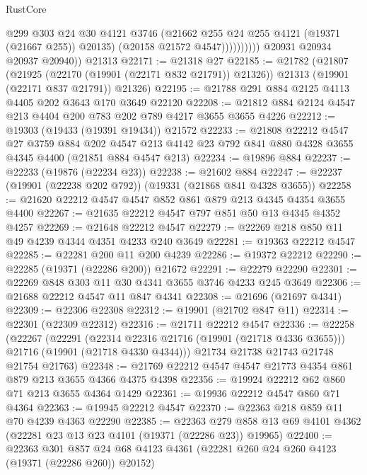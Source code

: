 \begin{lexlean}{RustCore}
\begin{coremodule}
                          @299
                          @303
                          @24
                          @30
                          @4121
                          @3746
                          (@21662 @255 @24 @255 @4121 (@19371 (@21667 @255)) @20135)
                          (@20158 @21572 @4547))))))))))
        @20931
        @20934
        @20937
        @20940))
    @21313
@22171 := @21318 @27
@22185 := @21782
    (@21807
      (@21925 (@22170 (@19901 (@22171 @832 @21791)) @21326))
      @21313
      (@19901 (@22171 @837 @21791))
      @21326)
@22195 := @21788 @291 @884 @2125 @4113 @4405 @202 @3643 @170 @3649 @22120
@22208 := @21812 @884 @2124 @4547 @213 @4404 @200 @783 @202 @789 @4217 @3655 @3655 @4226
@22212 := @19303 (@19433 (@19391 @19434)) @21572
@22233 := @21808
    @22212
    @4547
    @27
    @3759
    @884
    @202
    @4547
    @213
    @4142
    @23
    @792
    @841
    @880
    @4328
    @3655
    @4345
    @4400
    (@21851 @884 @4547 @213)
@22234 := @19896 @884
@22237 := @22233 (@19876 (@22234 @23))
@22238 := @21602 @884
@22247 := @22237 (@19901 (@22238 @202 @792)) (@19331 (@21868 @841 @4328 @3655))
@22258 := @21620 @22212 @4547 @4547 @852 @861 @879 @213 @4345 @4354 @3655 @4400
@22267 := @21635 @22212 @4547 @797 @851 @50 @13 @4345 @4352 @4257
@22269 := @21648 @22212 @4547
@22279 := @22269 @218 @850 @11 @49 @4239 @4344 @4351 @4233 @240 @3649
@22281 := @19363 @22212 @4547
@22285 := @22281 @200 @11 @200 @4239
@22286 := @19372 @22212
@22290 := @22285 (@19371 (@22286 @200)) @21672
@22291 := @22279 @22290
@22301 := @22269 @848 @303 @11 @30 @4341 @3655 @3746 @4233 @245 @3649
@22306 := @21688 @22212 @4547 @11 @847 @4341
@22308 := @21696 (@21697 @4341)
@22309 := @22306 @22308
@22312 := @19901 (@21702 @847 @11)
@22314 := @22301 (@22309 @22312)
@22316 := @21711 @22212 @4547
@22336 := @22258
    (@22267
      (@22291
        (@22314 @22316 @21716 (@19901 (@21718 @4336 @3655)))
        @21716
        (@19901 (@21718 @4330 @4344)))
      @21734
      @21738
      @21743
      @21748
      @21754
      @21763)
@22348 := @21769 @22212 @4547 @4547 @21773 @4354 @861 @879 @213 @3655 @4366 @4375 @4398
@22356 := @19924 @22212 @62 @860 @71 @213 @3655 @4364 @1429
@22361 := @19936 @22212 @4547 @860 @71 @4364
@22363 := @19945 @22212 @4547
@22370 := @22363 @218 @859 @11 @70 @4239 @4363 @22290
@22385 := @22363
    @279
    @858
    @13
    @69
    @4101
    @4362
    (@22281 @23 @13 @23 @4101 (@19371 (@22286 @23)) @19965)
@22400 := @22363
    @301
    @857
    @24
    @68
    @4123
    @4361
    (@22281 @260 @24 @260 @4123 (@19371 (@22286 @260)) @20152)

\end{coremodule}
\end{lexlean}
